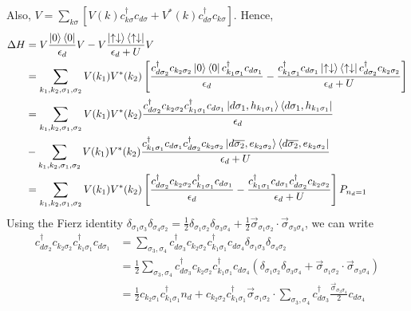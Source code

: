 \documentclass[twoside,11pt]{report}
\numberwithin{equation}{section}
\begin{document}
Also, \(V = \sum_{k\sigma}\left[V(k) c^\dagger_{k\sigma}c_{d\sigma} + V^*(k) c^\dagger_{d\sigma}c_{k\sigma}\right]\).
Hence,
\begin{equation}\begin{aligned}
\Delta H &= V\frac{\ket{0}\bra{0}}{\epsilon_d}V - V\frac{\ket{\uparrow\downarrow}\bra{\uparrow\downarrow}}{\epsilon_d + U}V\\
	 &= \sum_{k_1,k_2,\sigma_1,\sigma_2}V(k_1)V^*(k_2)\left[\frac{c^\dagger_{d\sigma_2} c_{k_2 \sigma_2}\ket{0}\bra{0}c^\dagger_{k_1\sigma_1} c_{d \sigma_1}}{\epsilon_d} - \frac{c^\dagger_{k_1\sigma_1} c_{d \sigma_1}\ket{\uparrow\downarrow}\bra{\uparrow\downarrow}c^\dagger_{d\sigma_2} c_{k_2 \sigma_2}}{\epsilon_d+U}\right]\\
&=\sum_{k_1,k_2,\sigma_1,\sigma_2}V(k_1)V^*(k_2)\frac{c^\dagger_{d\sigma_2} c_{k_2 \sigma_2}c^\dagger_{k_1\sigma_1} c_{d \sigma_1}\ket{d\sigma_1,h_{k_1\sigma_1}}\bra{d\sigma_1,h_{k_1\sigma_1}}}{\epsilon_d} \\
&- \sum_{k_1,k_2,\sigma_1,\sigma_2}V(k_1)V^*(k_2)\frac{c^\dagger_{k_1\sigma_1} c_{d \sigma_1}c^\dagger_{d\sigma_2} c_{k_2 \sigma_2}\ket{d\overline{\sigma_2},e_{k_2\sigma_2}}\bra{d\overline{\sigma_2},e_{k_2\sigma_2}}}{\epsilon_d+U}\\
&=\sum_{k_1,k_2,\sigma_1,\sigma_2}V(k_1)V^*(k_2)\left[\frac{c^\dagger_{d\sigma_2} c_{k_2 \sigma_2}c^\dagger_{k_1\sigma_1} c_{d \sigma_1}}{\epsilon_d} - \frac{c^\dagger_{k_1\sigma_1} c_{d \sigma_1}c^\dagger_{d\sigma_2} c_{k_2 \sigma_2}}{\epsilon_d+U}\right]P_{n_d=1}
\end{aligned}\end{equation}
Using the Fierz identity \(\delta_{\sigma_1\sigma_3}\delta_{\sigma_4\sigma_2} = \frac{1}{2}\delta_{\sigma_1\sigma_2}\delta_{\sigma_3\sigma_4} + \frac{1}{2}\vec\sigma_{\sigma_1\sigma_2}\cdot\vec\sigma_{\sigma_3\sigma_4}\), we can write
\begin{equation}\begin{aligned}
c^\dagger_{d\sigma_2} c_{k_2 \sigma_2}c^\dagger_{k_1\sigma_1} c_{d \sigma_1} &= \sum_{\sigma_3,\sigma_4}c^\dagger_{d\sigma_3} c_{k_2 \sigma_2}c^\dagger_{k_1\sigma_1} c_{d \sigma_4}\delta_{\sigma_1\sigma_3}\delta_{\sigma_4\sigma_2}\\
									     &=\frac{1}{2}\sum_{\sigma_3,\sigma_4}c^\dagger_{d\sigma_3} c_{k_2 \sigma_2}c^\dagger_{k_1\sigma_1} c_{d \sigma_4}\left(\delta_{\sigma_1\sigma_2}\delta_{\sigma_3\sigma_4} + \vec\sigma_{\sigma_1\sigma_2}\cdot\vec\sigma_{\sigma_3\sigma_4}\right)\\
&=\frac{1}{2} c_{k_2 \sigma_1}c^\dagger_{k_1\sigma_1}n_d+c_{k_2 \sigma_2}c^\dagger_{k_1\sigma_1}\vec\sigma_{\sigma_1\sigma_2}\cdot\sum_{\sigma_3,\sigma_4}c^\dagger_{d\sigma_3}\frac{\vec \sigma_{\sigma_3\sigma_4}}{2}c_{d\sigma_4}
\end{aligned}\end{equation}
\end{document}
